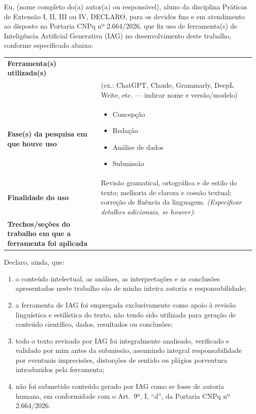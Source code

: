\bigskip
\noindent
Eu, \underline{\hspace{7cm}} (nome completo do(a) autor(a) ou responsável), aluno da disciplina Práticas de Extensão I, II, III ou IV, DECLARO, para os devidos fins e em atendimento ao disposto na Portaria CNPq nº 2.664/2026, que fiz uso de ferramenta(s) de Inteligência Artificial Generativa (IAG) no desenvolvimento deste trabalho, conforme especificado abaixo:

\bigskip
\begin{tabular}{|p{4.5cm}|p{9.5cm}|}
\hline
\textbf{Ferramenta(s) utilizada(s)} & \underline{\hspace{9cm}} \\
& (ex.: ChatGPT, Claude, Grammarly, DeepL Write, etc. --- indicar nome e versão/modelo) \\
\hline
\textbf{Fase(s) da pesquisa em que houve uso} &
\begin{itemize}[leftmargin=*, nosep]
  \item[$\square$] Concepção
  \item[$\square$] Redação
  \item[$\square$] Análise de dados
  \item[$\square$] Submissão
\end{itemize} \\
\hline
\textbf{Finalidade do uso} & Revisão gramatical, ortográfica e de estilo do texto;
melhoria de clareza e coesão textual; correção de fluência da linguagem.
\emph{(Especificar detalhes adicionais, se houver)}: \underline{\hspace{9cm}} \\
\hline
\textbf{Trechos/seções do trabalho em que a ferramenta foi aplicada} &
\underline{\hspace{9cm}} \\
\hline
\end{tabular}

\bigskip
\noindent
Declaro, ainda, que:
\begin{enumerate}[label=\alph*)]
  \item o conteúdo intelectual, as análises, as interpretações e as conclusões
  apresentadas neste trabalho são de minha inteira autoria e responsabilidade;
  \item a ferramenta de IAG foi empregada exclusivamente como apoio à revisão
  linguística e estilística do texto, não tendo sido utilizada para geração de
  conteúdo científico, dados, resultados ou conclusões;
  \item todo o texto revisado por IAG foi integralmente analisado, verificado e
  validado por mim antes da submissão, assumindo integral responsabilidade por
  eventuais imprecisões, distorções de sentido ou plágios porventura introduzidos
  pela ferramenta;
  \item não foi submetido conteúdo gerado por IAG como se fosse de autoria humana,
  em conformidade com o Art.~9º, I, ``d'', da Portaria CNPq nº 2.664/2026.
\end{enumerate}

